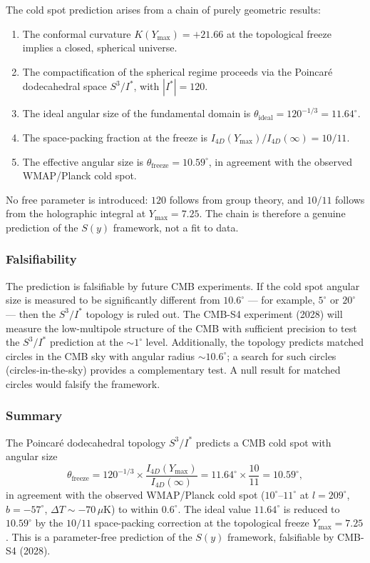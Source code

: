 \documentclass[12pt,oneside,openany]{book}
\begin{document}
The cold spot prediction arises from a chain of purely geometric results:
\begin{enumerate}
\item The conformal curvature $K(Y_{\max}) = +21.66$ at the topological freeze implies a closed, spherical universe.
\item The compactification of the spherical regime proceeds via the Poincar\'e dodecahedral space $S^3/I^*$, with $|I^*| = 120$.
\item The ideal angular size of the fundamental domain is $\theta_{\mathrm{ideal}} = 120^{-1/3} = 11.64^\circ$.
\item The space-packing fraction at the freeze is $I_{4D}(Y_{\max})/I_{4D}(\infty) = 10/11$.
\item The effective angular size is $\theta_{\mathrm{freeze}} = 10.59^\circ$, in agreement with the observed WMAP/Planck cold spot.
\end{enumerate}
No free parameter is introduced: $120$ follows from group theory, and $10/11$ follows from the holographic integral at $Y_{\max} = 7.25$. The chain is therefore a genuine prediction of the $S(y)$ framework, not a fit to data.

\subsubsection{Falsifiability}

The prediction is falsifiable by future CMB experiments. If the cold spot angular size is measured to be significantly different from $10.6^\circ$ — for example, $5^\circ$ or $20^\circ$ — then the $S^3/I^*$ topology is ruled out. The CMB-S4 experiment (2028) will measure the low-multipole structure of the CMB with sufficient precision to test the $S^3/I^*$ prediction at the $\sim 1^\circ$ level. Additionally, the topology predicts matched circles in the CMB sky with angular radius $\sim 10.6^\circ$; a search for such circles (circles-in-the-sky) provides a complementary test. A null result for matched circles would falsify the framework.

\subsubsection{Summary}

The Poincar\'e dodecahedral topology $S^3/I^*$ predicts a CMB cold spot with angular size
\begin{equation}
\boxed{\theta_{\mathrm{freeze}} = 120^{-1/3} \times \frac{I_{4D}(Y_{\max})}{I_{4D}(\infty)} = 11.64^\circ \times \frac{10}{11} = 10.59^\circ,}
\label{eq:coldspot-summary}
\end{equation}
in agreement with the observed WMAP/Planck cold spot ($10^\circ$--$11^\circ$ at $l = 209^\circ$, $b = -57^\circ$, $\Delta T \sim -70\,\mu\mathrm{K}$) to within $0.6^\circ$. The ideal value $11.64^\circ$ is reduced to $10.59^\circ$ by the $10/11$ space-packing correction at the topological freeze $Y_{\max} = 7.25$. This is a parameter-free prediction of the $S(y)$ framework, falsifiable by CMB-S4 (2028).
\end{document}
